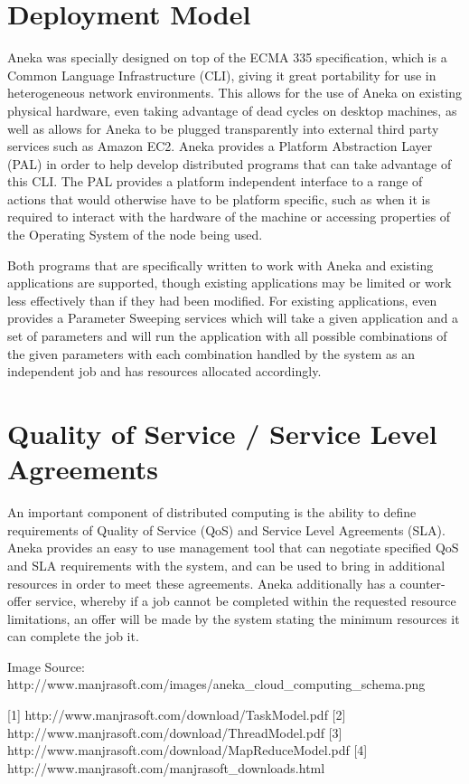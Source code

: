 \section{Deployment Model}
Aneka was specially designed on top of the ECMA 335 specification, which is a Common Language Infrastructure (CLI), giving it great portability for use in heterogeneous network environments. This allows for the use of Aneka on existing physical hardware, even taking advantage of dead cycles on desktop machines, as well as allows for Aneka to be plugged transparently into external third party services such as Amazon EC2. Aneka provides a Platform Abstraction Layer (PAL) in order to help develop distributed programs that can take advantage of this CLI. The PAL provides a platform independent interface to a range of actions that would otherwise have to be platform specific, such as when it is required to interact with the hardware of the machine or accessing properties of the Operating System of the node being used.

Both programs that are specifically written to work with Aneka and existing applications are supported, though existing applications may be limited or work less effectively than if they had been modified. For existing applications, even provides a Parameter Sweeping services which will take a given application and a set of parameters and will run the application with all possible combinations of the given parameters with each combination handled by the system as an independent job and has resources allocated accordingly.

\section{Quality of Service / Service Level Agreements}
An important component of distributed computing is the ability to define requirements of Quality of Service (QoS) and Service Level Agreements (SLA)\cite{CloudBus}. Aneka provides an easy to use management tool that can negotiate specified QoS and SLA requirements with the system, and can be used to bring in additional resources in order to meet these agreements. Aneka additionally has a counter-offer service, whereby if a job cannot be completed within the requested resource limitations, an offer will be made by the system stating the minimum resources it can complete the job it.


Image Source: http://www.manjrasoft.com/images/aneka\_cloud\_computing\_schema.png

[1] http://www.manjrasoft.com/download/TaskModel.pdf
[2] http://www.manjrasoft.com/download/ThreadModel.pdf
[3] http://www.manjrasoft.com/download/MapReduceModel.pdf
[4] http://www.manjrasoft.com/manjrasoft\_downloads.html
